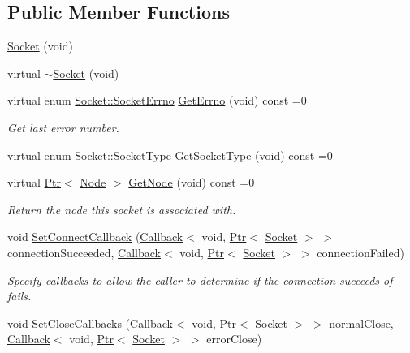 \subsection*{Public Member Functions}
\begin{DoxyCompactItemize}
\item 
\hyperlink{classns3_1_1Socket_a1e22267afc490a4b15b8a764289a4000}{Socket} (void)
\item 
virtual \hyperlink{classns3_1_1Socket_a81fa720966d2f8de74d1e05f5139b8c6}{$\sim$\+Socket} (void)
\item 
virtual enum \hyperlink{classns3_1_1Socket_ada1328c5ae0c28cb2a982caf8f6d6cca}{Socket\+::\+Socket\+Errno} \hyperlink{classns3_1_1Socket_ae489616249d946f3c0dc831c05d0d711}{Get\+Errno} (void) const =0
\begin{DoxyCompactList}\small\item\em Get last error number. \end{DoxyCompactList}\item 
virtual enum \hyperlink{classns3_1_1Socket_a698fbcc486a48b7a0d2b0e4ab863d571}{Socket\+::\+Socket\+Type} \hyperlink{classns3_1_1Socket_af9333cfc006d6ed9363f20d3822fedcb}{Get\+Socket\+Type} (void) const =0
\item 
virtual \hyperlink{classns3_1_1Ptr}{Ptr}$<$ \hyperlink{classns3_1_1Node}{Node} $>$ \hyperlink{classns3_1_1Socket_aba642ad4301c1df47befc0aa9afa2e48}{Get\+Node} (void) const =0
\begin{DoxyCompactList}\small\item\em Return the node this socket is associated with. \end{DoxyCompactList}\item 
void \hyperlink{classns3_1_1Socket_a18935c615315a1921ea52c1b8c16be7f}{Set\+Connect\+Callback} (\hyperlink{classns3_1_1Callback}{Callback}$<$ void, \hyperlink{classns3_1_1Ptr}{Ptr}$<$ \hyperlink{classns3_1_1Socket}{Socket} $>$ $>$ connection\+Succeeded, \hyperlink{classns3_1_1Callback}{Callback}$<$ void, \hyperlink{classns3_1_1Ptr}{Ptr}$<$ \hyperlink{classns3_1_1Socket}{Socket} $>$ $>$ connection\+Failed)
\begin{DoxyCompactList}\small\item\em Specify callbacks to allow the caller to determine if the connection succeeds of fails. \end{DoxyCompactList}\item 
void \hyperlink{classns3_1_1Socket_acac93d69d477332371fe83397ed8beeb}{Set\+Close\+Callbacks} (\hyperlink{classns3_1_1Callback}{Callback}$<$ void, \hyperlink{classns3_1_1Ptr}{Ptr}$<$ \hyperlink{classns3_1_1Socket}{Socket} $>$ $>$ normal\+Close, \hyperlink{classns3_1_1Callback}{Callback}$<$ void, \hyperlink{classns3_1_1Ptr}{Ptr}$<$ \hyperlink{classns3_1_1Socket}{Socket} $>$ $>$ error\+Close)

\end{DoxyCompactItemize}
